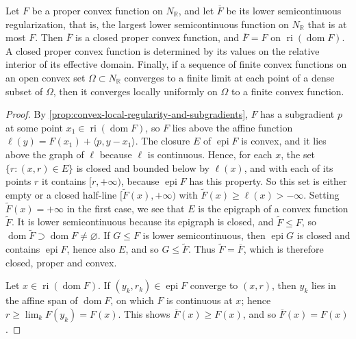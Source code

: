 \begin{proposition}\label{prop:convex-closure-and-dense-convergence}
Let $F$ be a proper convex function on $N_{\mathbb R}$, and let $\overline F$ be its lower semicontinuous regularization, that is, the largest lower semicontinuous function on $N_{\mathbb R}$ that is at most $F$. Then $\overline F$ is a closed proper convex function, and $\overline F=F$ on $\operatorname{ri}(\operatorname{dom}F)$. A closed proper convex function is determined by its values on the relative interior of its effective domain. Finally, if a sequence of finite convex functions on an open convex set $\Omega\subset N_{\mathbb R}$ converges to a finite limit at each point of a dense subset of $\Omega$, then it converges locally uniformly on $\Omega$ to a finite convex function.
\end{proposition}
\begin{proof}
By \cref{prop:convex-local-regularity-and-subgradients}, $F$ has a subgradient $p$ at some point $x_1\in\operatorname{ri}(\operatorname{dom}F)$, so $F$ lies above the affine function $\ell(y)=F(x_1)+\langle p,y-x_1\rangle$. The closure $E$ of $\operatorname{epi}F$ is convex, and it lies above the graph of $\ell$ because $\ell$ is continuous. Hence, for each $x$, the set $\{r:(x,r)\in E\}$ is closed and bounded below by $\ell(x)$, and with each of its points $r$ it contains $[r,+\infty)$, because $\operatorname{epi}F$ has this property. So this set is either empty or a closed half-line $[\widetilde F(x),+\infty)$ with $\widetilde F(x)\geq\ell(x)>-\infty$. Setting $\widetilde F(x)=+\infty$ in the first case, we see that $E$ is the epigraph of a convex function $\widetilde F$. It is lower semicontinuous because its epigraph is closed, and $\widetilde F\leq F$, so $\operatorname{dom}\widetilde F\supset\operatorname{dom}F\neq\varnothing$. If $G\leq F$ is lower semicontinuous, then $\operatorname{epi}G$ is closed and contains $\operatorname{epi}F$, hence also $E$, and so $G\leq\widetilde F$. Thus $\widetilde F=\overline F$, which is therefore closed, proper and convex.

Let $x\in\operatorname{ri}(\operatorname{dom}F)$. If $(y_k,r_k)\in\operatorname{epi}F$ converge to $(x,r)$, then $y_k$ lies in the affine span of $\operatorname{dom}F$, on which $F$ is continuous at $x$; hence $r\geq\lim_kF(y_k)=F(x)$. This shows $\overline F(x)\geq F(x)$, and so $\overline F(x)=F(x)$.


\end{proof}

